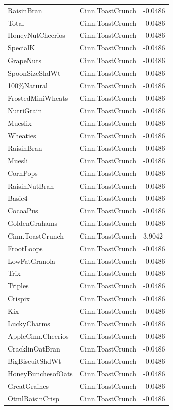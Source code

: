 \begin{table}[!htbp]
\begin{tabular}{lll}
RaisinBran & Cinn.ToastCrunch & -0.0486
\\
Total & Cinn.ToastCrunch & -0.0486
\\
HoneyNutCheerios & Cinn.ToastCrunch & -0.0486
\\
SpecialK & Cinn.ToastCrunch & -0.0486
\\
GrapeNuts & Cinn.ToastCrunch & -0.0486
\\
SpoonSizeShdWt & Cinn.ToastCrunch & -0.0486
\\
100\%Natural & Cinn.ToastCrunch & -0.0486
\\
FrostedMiniWheats & Cinn.ToastCrunch & -0.0486
\\
NutriGrain & Cinn.ToastCrunch & -0.0486
\\
Mueslix & Cinn.ToastCrunch & -0.0486
\\
Wheaties & Cinn.ToastCrunch & -0.0486
\\
RaisinBran & Cinn.ToastCrunch & -0.0486
\\
Muesli & Cinn.ToastCrunch & -0.0486
\\
CornPops & Cinn.ToastCrunch & -0.0486
\\
RaisinNutBran & Cinn.ToastCrunch & -0.0486
\\
Basic4 & Cinn.ToastCrunch & -0.0486
\\
CocoaPus & Cinn.ToastCrunch & -0.0486
\\
GoldenGrahams & Cinn.ToastCrunch & -0.0486
\\
Cinn.ToastCrunch & Cinn.ToastCrunch & 3.9042
\\
FrootLoops & Cinn.ToastCrunch & -0.0486
\\
LowFatGranola & Cinn.ToastCrunch & -0.0486
\\
Trix & Cinn.ToastCrunch & -0.0486
\\
Triples & Cinn.ToastCrunch & -0.0486
\\
Crispix & Cinn.ToastCrunch & -0.0486
\\
Kix & Cinn.ToastCrunch & -0.0486
\\
LuckyCharms & Cinn.ToastCrunch & -0.0486
\\
AppleCinn.Cheerios & Cinn.ToastCrunch & -0.0486
\\
CracklinOatBran & Cinn.ToastCrunch & -0.0486
\\
BigBiscuitShdWt & Cinn.ToastCrunch & -0.0486
\\
HoneyBunchesofOats & Cinn.ToastCrunch & -0.0486
\\
GreatGraines & Cinn.ToastCrunch & -0.0486
\\
OtmlRaisinCrisp & Cinn.ToastCrunch & -0.0486

\end{tabular}
\end{table}
